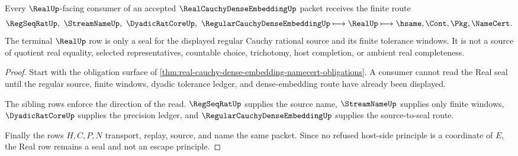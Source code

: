 \begin{theorem}
\label{thm:real-cauchy-dense-embedding-real-seal-nonescape}
Every $\RealUp$-facing consumer of an accepted $\RealCauchyDenseEmbeddingUp$ packet receives the finite route
$$
\RegSeqRatUp,\ \StreamNameUp,\ \DyadicRatCoreUp,\ \RegularCauchyDenseEmbeddingUp \longmapsto \RealUp \longmapsto \hsame,\Cont,\Pkg,\NameCert .
$$
The terminal $\RealUp$ row is only a seal for the displayed regular Cauchy rational source and its finite tolerance windows. It is not a source of quotient real equality, selected representatives, countable choice, trichotomy, host completion, or ambient real completeness.
\end{theorem}
\begin{proof}
Start with the obligation surface of \autoref{thm:real-cauchy-dense-embedding-namecert-obligations}. A consumer cannot read the Real seal until the regular source, finite windows, dyadic tolerance ledger, and dense-embedding route have already been displayed.

The sibling rows enforce the direction of the read. $\RegSeqRatUp$ supplies the source name, $\StreamNameUp$ supplies only finite windows, $\DyadicRatCoreUp$ supplies the precision ledger, and $\RegularCauchyDenseEmbeddingUp$ supplies the source-to-seal route.

Finally the rows $H,C,P,N$ transport, replay, source, and name the same packet. Since no refused host-side principle is a coordinate of $E$, the Real row remains a seal and not an escape principle.
\end{proof}




